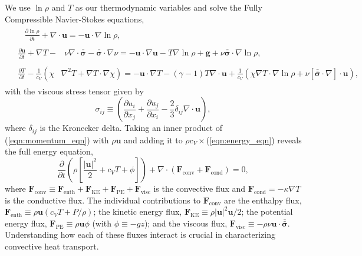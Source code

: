 \documentclass[aps, pre, onecolumn, nofootinbib, notitlepage, groupedaddress, amsfonts, amssymb, amsmath, longbibliography]{revtex4-1}
\newcommand{\Div}[1]{\ensuremath{\nabla\cdot\left( #1\right)}}
\newcommand{\grad}{\ensuremath{\nabla}}
\newcommand{\lilstressT}{\ensuremath{\bm{\bar{\bar{\sigma}}}}}
\begin{document}
We use $\ln \rho$ and $T$ as our thermodynamic variables and solve the Fully 
Compressible Navier-Stokes equations,
\begin{align}
&\begin{aligned}
&\frac{\partial \ln\rho}{\partial t} + \grad\cdot\bm{u} 
    = -\bm{u}\cdot\grad\ln\rho,
	\label{eqn:continuity_eqn}
\end{aligned}\\
&\begin{aligned}
\frac{\partial\bm{u}}{\partial t} + \grad T - 
&\nu\grad\cdot\lilstressT - \lilstressT\cdot\grad\nu =
-\bm{u}\cdot\grad\bm{u} - T\grad\ln\rho + \bm{g} + 
\nu\lilstressT\cdot\grad\ln\rho,
\label{eqn:momentum_eqn}
\end{aligned}\\
&\begin{aligned}
\frac{\partial T}{\partial t} -\frac{1}{c_V}\left(\right.\chi&\left.
    \grad^2 T + \grad T\cdot\grad\chi\right) =
	-\bm{u}\cdot\grad T - (\gamma-1)T\grad\cdot{\bm{u}}
	+ \frac{1}{c_V}\left(\chi\grad T \cdot\grad\ln\rho +
	\nu\left[\lilstressT\cdot\nabla\right]\cdot\bm{u}\right), 
	\label{eqn:energy_eqn}
\end{aligned}
\end{align}
with the viscous stress tensor given by
\begin{equation}
\sigma_{ij} \equiv \left(\frac{\partial u_i}{\partial x_j} + 
\frac{\partial u_j}{\partial x_i} - \frac{2}{3}\delta_{ij}\grad\cdot\bm{u}\right),
	\label{eqn:stress_tensor}
\end{equation}
where $\delta_{ij}$ is the Kronecker delta. Taking an inner product of
(\ref{eqn:momentum_eqn}) with $\rho\bm{u}$ and adding it to 
$\rho c_V\times$(\ref{eqn:energy_eqn}) reveals the full energy equation,
\begin{equation}
\frac{\partial}{\partial t}\left(\rho\left[\frac{|\bm{u}|^2}{2} + c_V T + \phi\right]\right) +
\Div{\bm{F}_{\text{conv}} + \bm{F}_{\text{cond}}} = 0,
	\label{eqn:energy_eqn_full}
\end{equation}
where
$
\bm{F}_{\text{conv}} \equiv \bm{F}_{\text{enth}} + \bm{F}_{\text{KE}} + \bm{F}_{\text{PE}} + \bm{F}_{\text{visc}}
$
is the convective flux and $\bm{F}_{\text{cond}} = -\kappa \grad T$
is the conductive flux.
The individual contributions to $\bm{F}_{\text{conv}}$ are the enthalpy flux, 
$\bm{F}_{\text{enth}} \equiv \rho\bm{u}(c_V T + P/\rho)$;
the kinetic energy flux, 
$\bm{F}_{\text{KE}} \equiv \rho|\bm{u}|^2\bm{u}/2$;
the potential energy flux,
$\bm{F}_{\text{PE}} \equiv \rho\bm{u}\phi$ (with $\phi \equiv -gz$);
and the viscous flux, 
$\bm{F}_{\text{visc}} \equiv -\rho\nu\bm{u}\cdot\lilstressT$.
Understanding how each of these fluxes interact  
is crucial in characterizing convective heat transport.
\end{document}
